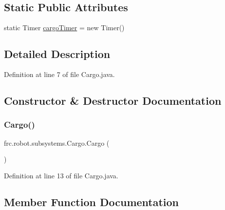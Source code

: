 \subsection*{Static Public Attributes}
\begin{DoxyCompactItemize}
\item 
static Timer \hyperlink{classfrc_1_1robot_1_1subsystems_1_1_cargo_a50722902fa0c3ad0db5f592ad51b94f6}{cargo\+Timer} = new Timer()
\end{DoxyCompactItemize}


\subsection{Detailed Description}


Definition at line 7 of file Cargo.\+java.



\subsection{Constructor \& Destructor Documentation}
\mbox{\label{classfrc_1_1robot_1_1subsystems_1_1_cargo_ad27213bb1c8c9a33d5c2b9cc153c1508}} 
\subsubsection{\texorpdfstring{Cargo()}{Cargo()}}
{\footnotesize\ttfamily frc.\+robot.\+subsystems.\+Cargo.\+Cargo (\begin{DoxyParamCaption}{ }\end{DoxyParamCaption})}



Definition at line 13 of file Cargo.\+java.



\subsection{Member Function Documentation}
\mbox{\label{classfrc_1_1robot_1_1subsystems_1_1_cargo_aa8640bc75e8b3f2472ea586936d6ed1f}} 
